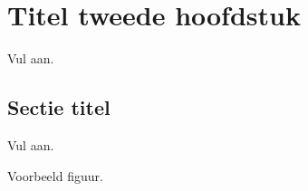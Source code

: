 \chapter{Titel tweede hoofdstuk}
\label{chap:evaluation}

Vul aan.

\lipsum[9-10]

\section{Sectie titel}
\label{sec:scalable_faafo}

Vul aan.

\lipsum[10-12]
Voorbeeld figuur.